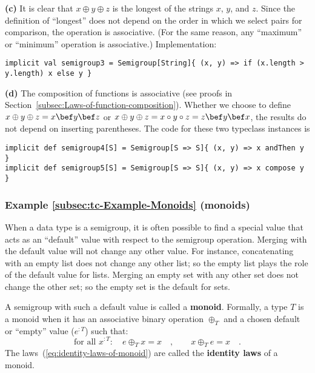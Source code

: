 \textbf{(c)} It is clear that $x\oplus y\oplus z$ is the longest
of the strings $x$, $y$, and $z$. Since the definition of \textsf{``}longest\textsf{''}
does not depend on the order in which we select pairs for comparison,
the operation is associative. (For the same reason, any \textsf{``}maximum\textsf{''}
or \textsf{``}minimum\textsf{''} operation is associative.) Implementation:
\begin{lstlisting}
implicit val semigroup3 = Semigroup[String]{ (x, y) => if (x.length > y.length) x else y }
\end{lstlisting}

\textbf{(d)} The composition of functions is associative (see proofs
in Section~\ref{subsec:Laws-of-function-composition}). Whether we
choose to define $x\oplus y\oplus z=x\bef y\bef z$ or $x\oplus y\oplus z=x\circ y\circ z=z\bef y\bef x$,
the results do not depend on inserting parentheses. The code for these
two typeclass instances is
\begin{lstlisting}
implicit def semigroup4[S] = Semigroup[S => S]{ (x, y) => x andThen y }
implicit def semigroup5[S] = Semigroup[S => S]{ (x, y) => x compose y }
\end{lstlisting}


\subsubsection{Example \label{subsec:tc-Example-Monoids}\ref{subsec:tc-Example-Monoids}
(monoids)}

When a data type is a semigroup, it is often possible to find a special
value that acts as an \textsf{``}default\textsf{''} value with respect to the semigroup
operation. Merging with the default value will not change any other
value. For instance, concatenating with an empty list does not change
any other list; so the empty list plays the role of the default value
for lists. Merging an empty set with any other set does not change
the other set; so the empty set is the default for sets.

A semigroup with such a default value is called a \textbf{monoid}.
Formally, a type $T$ is a monoid when it has an associative binary
operation $\oplus_{T}$ and a chosen default or \textsf{``}empty\textsf{''} value
($e^{:T}$) such that: 
\begin{equation}
\text{for all }x^{:T}:\quad e\oplus_{T}x=x\quad,\quad\quad x\oplus_{T}e=x\quad.\label{eq:identity-laws-of-monoid}
\end{equation}
The laws~(\ref{eq:identity-laws-of-monoid}) are called the \textbf{identity
laws} of a monoid. 

